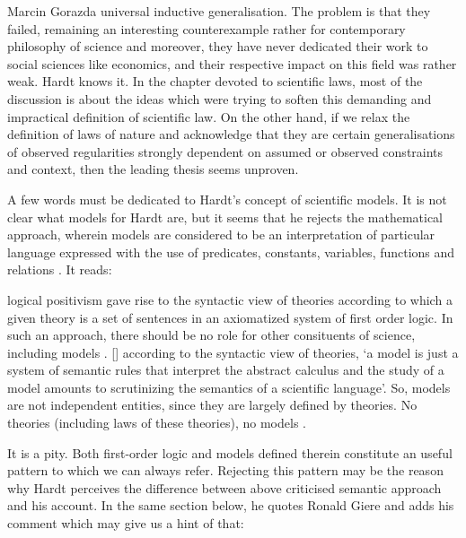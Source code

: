\begin{recengenv}{Marcin Gorazda}
universal inductive generalisation. The problem is that they failed, remaining an interesting counterexample rather for
contemporary philosophy of science and moreover, they have never dedicated their work to social sciences like
economics, and their respective impact on this field was rather weak. Hardt knows it. In the chapter devoted to
scientific laws, most of the discussion is about the ideas which were trying to soften this demanding and impractical
definition of scientific law. On the other hand, if we relax the definition of laws of nature and acknowledge that they
are certain generalisations of observed regularities strongly dependent on assumed or observed constraints and context,
then the leading thesis seems unproven. 

A few words must be dedicated to Hardt’s concept of scientific models. It is not clear what models for Hardt are, but it
seems that he rejects the mathematical approach, wherein models are considered to be an interpretation of particular
language expressed with the use of predicates, constants, variables, functions and relations
\parencite{margaris_first_1990}.
It reads:

\begin{myquoterev}
[\mydots] logical positivism gave rise to the syntactic view of theories according to which a given theory is a set of
sentences in an axiomatized system of first order logic. In such an approach, there should be no role for other
consituents of science, including models . [\mydots] according to the syntactic view of theories, ‘a model is just a system
of semantic rules that interpret the abstract calculus and the study of a model amounts to scrutinizing the semantics
of a scientific language’. So, models are not independent entities, since they are largely defined by theories. No
theories (including laws of these theories), no models
\parencite[p.71]{hardt_economics_2017}.
\end{myquoterev}

It is a pity. Both first-order logic and models defined therein constitute an useful pattern to which we can always
refer. Rejecting this pattern may be the reason why Hardt perceives the difference between above criticised semantic
approach and his account. In the same section below, he quotes Ronald Giere and adds his comment which may give us a hint of
that:

\enlargethispage{-.5\baselineskip}


\end{recengenv}
